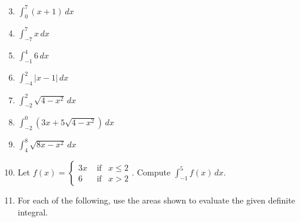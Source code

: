 \documentclass[12pt]{article}
\newif\ifans
\begin{document}

\begin{enumerate}
\setcounter{enumi}{2}

\item $\int_0^7{(x+1)}\,dx$

\ifans{\fbox{$\frac{63}{2}$}} \fi

\item $\int_{-7}^7{x}\,dx$

\ifans{\fbox{$0$}} \fi

\item $\int_{-1}^4{6}\,dx$

\ifans{\fbox{$30$}} \fi

\item $\int_{-4}^{2}{|x-1|} \,dx$

\ifans{\fbox{$13$}} \fi

\item $\int_{-2}^2{\sqrt{4-x^2}} \,dx$

\ifans{\fbox{$2\pi$}} \fi

\item $\int_{-2}^0{\left(3x+5\sqrt{4-x^2}\right)} \,dx$

\ifans{\fbox{$-6+5\pi$; Detailed Solution: \textcolor{blue}{\href{http://www.math.drexel.edu/classes/Calculus/resources/Math122HW/Solutions/122_02_Definite_08.pdf}{Here}}}} \fi

\item $\int_4^8{\sqrt{8x-x^2}} \,dx$

\ifans{\fbox{$4\pi$}} \fi

\item Let $f(x)=\left\{\begin{array}{lll}
3x & \text{ if} & x \leq 2 \\
6 & \text{ if} & x>2
\end{array}\right.$.  Compute $\int_{-1}^5{f(x)} \,dx$.

\ifans{\fbox{$\frac{45}{2}$; Detailed Solution: \textcolor{blue}{\href{http://www.math.drexel.edu/classes/Calculus/resources/Math122HW/Solutions/122_02_Definite_10.pdf}{Here}}}} \fi

\item For each of the following, use the areas shown to evaluate the given definite integral.

\begin{center}


\end{center}
\end{enumerate}
\end{document}
